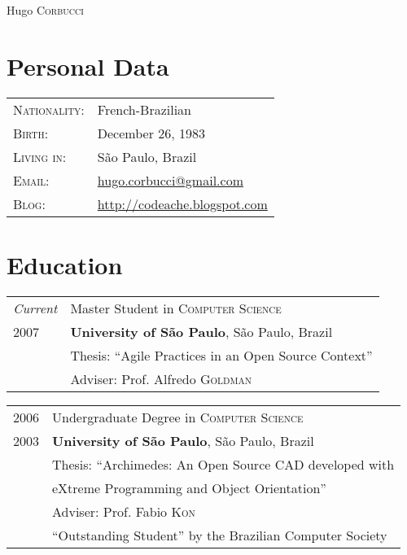 \documentclass[letter,10pt]{article}
\begin{document}
\par{\centering
		{\Huge Hugo \textsc{Corbucci}
	}\bigskip\par}

      \section{Personal Data}

\begin{tabular}{p{2.5cm}l}
  \textsc{Nationality:} & French-Brazilian
  \\
  \textsc{Birth:} & December 26, 1983 \\
  \textsc{Living in:}   & São Paulo, Brazil \\
  \textsc{Email:}     &
  \href{mailto:hugo.corbucci@gmail.com}{hugo.corbucci@gmail.com}\\
  \textsc{Blog:}     & \href{http://codeache.blogspot.com}{http://codeache.blogspot.com}
\end{tabular}

\section{Education}
\begin{tabular}{p{2.5cm}l}
  \emph{Current} & Master Student in \textsc{Computer Science}\\
  \textsc{2007} & \textbf{University of São Paulo}, São Paulo, Brazil\\
  & Thesis: ``Agile Practices in an Open Source Context''\\
  & \small Adviser: Prof. Alfredo \textsc{Goldman}\\
\end{tabular}

\begin{tabular}{p{2.5cm}l}
  \textsc{2006} & Undergraduate Degree in \textsc{Computer Science}\\
  \textsc{2003} &\normalsize\textbf{University of São Paulo}, São
  Paulo, Brazil\\
  & Thesis: ``Archimedes: An Open Source CAD developed with\\
  & eXtreme Programming and Object Orientation''\\
  & \small Adviser: Prof. Fabio \textsc{Kon}\\
  & ``Outstanding Student'' by the Brazilian Computer Society\\
\end{tabular}
\end{document}

